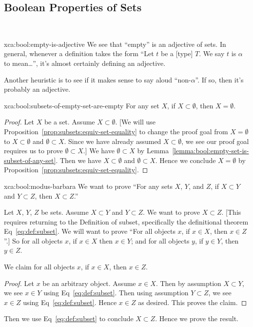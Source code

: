 \subsection{Boolean Properties of Sets } \

\begin{solution}{xca:bool:empty-is-adjective}
We see that ``empty'' is an adjective of sets. In general, whenever a
definition takes the form ``Let $t$ be a [type] $T$. We say $t$ is
$\alpha$ to mean\dots'', it's almost certainly defining an adjective.

Another heuristic is to see if it makes sense to say aloud ``non-$\alpha$''.
If so, then it's probably an adjective.
\end{solution}

\begin{solution}{xca:bool:subsets-of-empty-set-are-empty}
For any set $X$, if $X\subset\emptyset$, then $X=\emptyset$.

\begin{proof}
Let $X$ be a set. Assume $X\subset\emptyset$. [We will use
Proposition~\ref{prop:subsets:equiv-set-equality} to change the proof
goal from $X=\emptyset$ to $X\subset\emptyset$ and $\emptyset\subset X$.
Since we have already assumed $X\subset\emptyset$, we see our proof goal
requires us to prove $\emptyset\subset X$.]
We have $\emptyset\subset X$ by Lemma~\ref{lemma:bool:empty-set-is-subset-of-any-set}.
Then we have $X\subset\emptyset$ and $\emptyset\subset X$.
Hence we conclude $X=\emptyset$ by Proposition~\ref{prop:subsets:equiv-set-equality}.
\end{proof}
\end{solution}


\begin{solution}{xca:bool:modus-barbara}
We want to prove ``For any sets $X$, $Y$, and
$Z$, if $X\subset Y$ and $Y\subset Z$, then $X\subset Z$.''

Let $X$, $Y$, $Z$ be sets. Assume $X\subset Y$ and $Y\subset Z$.
We want to prove $X\subset Z$. [This requires returning to the
Definition of subset, specifically the definitional theorem Eq~\eqref{eq:def:subset}.
We will want to prove ``For all objects $x$, if $x\in X$, then $x\in Z$''.]
So for all objects $x$, if $x\in X$ then $x\in Y$; and for all objects
$y$, if $y\in Y$, then $y\in Z$.

We claim for all objects $x$, if $x\in X$, then $x\in Z$.
\begin{proof}
Let $x$ be an
arbitrary object. Assume $x\in X$. Then by assumption $X\subset Y$, we
see $x\in Y$ using Eq~\eqref{eq:def:subset}. Then using assumption
$Y\subset Z$, we see $x\in Z$ using Eq~\eqref{eq:def:subset}. Hence $x\in Z$
as desired. This proves the claim.
\end{proof}
Then we use Eq~\eqref{eq:def:subset} to conclude $X\subset Z$.
Hence we prove the result.
\end{solution}

